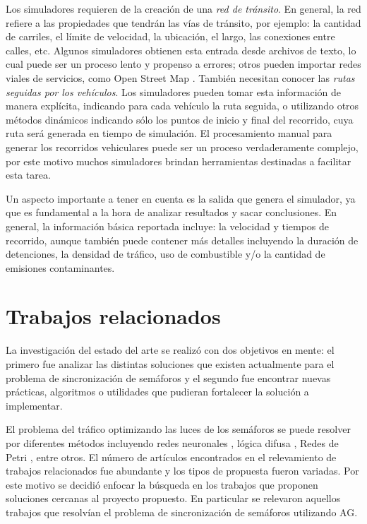 Los simuladores requieren de la creación de una \emph{red de tránsito}. En general, la red refiere a las propiedades que tendrán las vías de tránsito, por ejemplo: la cantidad de carriles, el límite de velocidad, la ubicación, el largo, las conexiones entre calles, etc. Algunos simuladores obtienen esta entrada desde archivos de texto, lo cual puede ser un proceso lento y propenso a errores; otros pueden importar redes viales de servicios, como Open Street Map \citep{OSM}. También necesitan conocer las\emph{ rutas seguidas por los vehículos}. Los simuladores pueden tomar esta información de manera explícita, indicando para cada vehículo la ruta seguida, o utilizando otros métodos dinámicos indicando sólo los puntos de inicio y final del recorrido, cuya ruta será generada en tiempo de simulación. El procesamiento manual para generar los recorridos vehiculares puede ser un proceso verdaderamente complejo, por este motivo muchos simuladores brindan herramientas destinadas a facilitar esta tarea.

Un aspecto importante a tener en cuenta es la salida que genera el simulador, ya que es fundamental a la hora de analizar resultados y sacar conclusiones. En general, la información básica reportada incluye: la velocidad y tiempos de recorrido, aunque también puede contener más detalles incluyendo la duración de detenciones, la densidad de tráfico, uso de combustible y/o la cantidad de emisiones contaminantes.  
 
\section{Trabajos relacionados}

La investigación del estado del arte se realizó con dos objetivos en mente: el primero fue analizar las distintas soluciones que existen actualmente para el problema de sincronización de semáforos y el segundo fue encontrar nuevas prácticas, algoritmos o utilidades que pudieran fortalecer la solución a implementar.

El problema del tráfico optimizando las luces de los semáforos se puede resolver por diferentes métodos incluyendo  redes neuronales \citep{Lopez1999}, lógica difusa \citep{Lim2001}, Redes de Petri \citep{DiFebbraro2002}, entre otros. El número de artículos encontrados en el relevamiento de trabajos relacionados fue abundante y los tipos de propuesta fueron variadas. Por este motivo se decidió enfocar la búsqueda en los trabajos que proponen soluciones cercanas al proyecto propuesto. En particular se relevaron aquellos trabajos que resolvían el problema de sincronización de semáforos utilizando AG.

